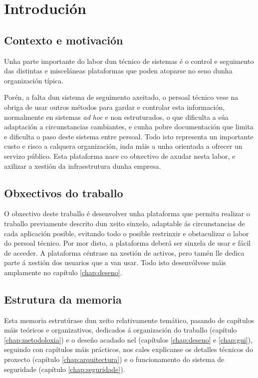 \chapter{Introdución}
\label{chap:introducion}

\section{Contexto e motivación}

Unha parte importante do labor dun técnico de sistemas é o control e seguimento das distintas e misceláneas plataformas que poden atoparse no seno dunha organización típica.

Porén, a falta dun sistema de seguimento axeitado, o persoal técnico vese na obriga de usar outros métodos para gardar e controlar esta información, normalmente en sistemas \textit{ad hoc} e non estruturados, o que dificulta a súa adaptación a circunstancias cambiantes, e cunha pobre documentación que limita e dificulta o paso deste sistema entre persoal. Todo isto representa un importante custo e risco a calquera organización,\cite{nyt} inda máis a unha orientada a ofrecer un servizo público. Esta plataforma nace co obxectivo de axudar nesta labor, e axilizar a xestión da infraestrutura dunha empresa.

\section{Obxectivos do traballo}

O obxectivo deste traballo é desenvolver unha plataforma que permita realizar o traballo previamente descrito dun xeito sinxelo, adaptable ás circunstancias de cada aplicación posible, evitando todo o posible restrinxir e obstaculizar o labor do persoal técnico. Por mor disto, a plataforma deberá ser sinxela de usar e fácil de acceder. A plataforma céntrase na xestión de activos, pero tamén lle dedica parte á xestión dos usuarios que a van usar. Todo isto desenvólvese máis amplamente no capítulo \ref{chap:deseno}.

\section{Estrutura da memoria}

Esta memoria estrutúrase dun xeito relativamente temático, pasando de capítulos máis teóricos e organizativos, dedicados á organización do traballo (capítulo \ref{chap:metodoloxia}) e o deseño acadado nel (capítulos \ref{chap:deseno} e \ref{chap:gui}), seguindo con capítulos máis prácticos, nos cales explícanse os detalles técnicos do proxecto (capítulo \ref{chap:arquitectura}) e o funcionamento do sistema de seguridade (capítulo \ref{chap:seguridade}).

